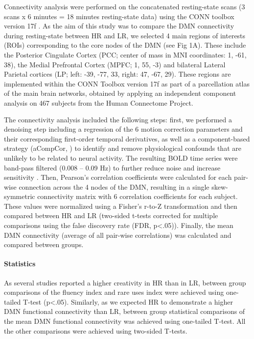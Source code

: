 Connectivity analysis were performed on the concatenated resting-state scans (3 scans x 6 minutes = 18 minutes resting-state data) using the CONN toolbox version 17f \citep{whitfield-gabrieli_conn:_2012}. As the aim of this study was to compare the DMN connectivity during resting-state between HR and LR, we selected 4 main regions of interests (ROIs) corresponding to the core nodes of the DMN (see Fig 1A). These include the Posterior Cingulate Cortex (PCC; center of mass in MNI coordinates: 1, -61, 38), the Medial Prefrontal Cortex (MPFC; 1, 55, -3) and bilateral Lateral Parietal cortices (LP; left: -39, -77, 33, right: 47, -67, 29). These regions are implemented within the CONN Toolbox version 17f as part of a parcellation atlas of the main brain networks, obtained by applying an independent component analysis on 467 subjects from the Human Connectome Project.

The connectivity analysis included the following steps: first, we performed a denoising step including a regression of the 6 motion correction parameters and their corresponding first-order temporal derivatives, as well as a component-based strategy (aCompCor, \citealp{behzadi_component_2007}) to identify and remove physiological confounds that are unlikely to be related to neural activity. The resulting BOLD time series were band-pass filtered (0.008 – 0.09 Hz) to further reduce noise and increase sensitivity \citep{weissenbacher_correlations_2009}. Then, Pearson’s correlation coefficients were calculated for each pair-wise connection across the 4 nodes of the DMN, resulting in a single skew-symmetric connectivity matrix with 6 correlation coefficients for each subject. These values were normalized using a Fisher’s r-to-Z transformation and then compared between HR and LR (two-sided t-tests corrected for multiple comparisons using the false discovery rate (FDR, p<.05)). Finally, the mean DMN connectivity (average of all pair-wise correlations) was calculated and compared between groups.

\paragraph{Statistics}
As several studies reported a higher creativity in HR than in LR, between group comparisons of the fluency index and rare uses index were achieved using one-tailed T-test (p<.05). Similarly, as we expected HR to demonstrate a higher DMN functional connectivity than LR, between group statistical comparisons of the mean DMN functional connectivity was achieved using one-tailed T-test. All the other comparisons were achieved using two-sided T-tests.


